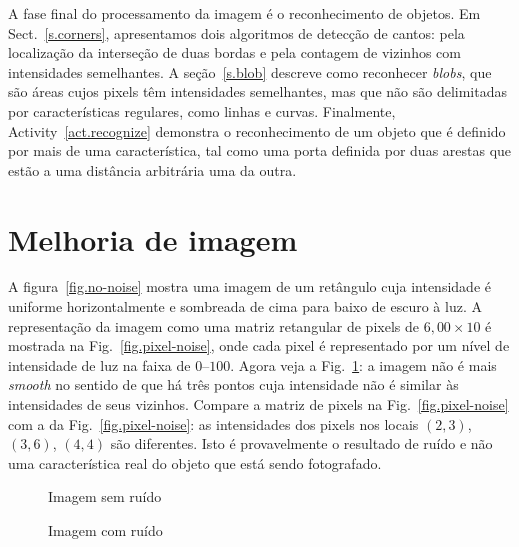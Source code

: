 A fase final do processamento da imagem é o reconhecimento de objetos. Em Sect.~\ref{s.corners}, apresentamos dois algoritmos de detecção de cantos: pela localização da interseção de duas bordas e pela contagem de vizinhos com intensidades semelhantes. A seção~\ref{s.blob} descreve como reconhecer \emph{blobs}, que são áreas cujos pixels têm intensidades semelhantes, mas que não são delimitadas por características regulares, como linhas e curvas. Finalmente, Activity~\ref{act.recognize} demonstra o reconhecimento de um objeto que é definido por mais de uma característica, tal como uma porta definida por duas arestas que estão a uma distância arbitrária uma da outra.

\section{Melhoria de imagem}\label{s.enhance}

A figura~\ref{fig.no-noise} mostra uma imagem de um retângulo cuja intensidade é uniforme horizontalmente e sombreada de cima para baixo de escuro à luz. A representação da imagem como uma matriz retangular de pixels de $6,00\times 10$ é mostrada na Fig.~\ref{fig.pixel-noise}, onde cada pixel é representado por um nível de intensidade de luz na faixa de $0$--$100$. Agora veja a Fig.~\ref{fig.noise}: a imagem não é mais \emph{smooth} no sentido de que há três pontos cuja intensidade não é similar às intensidades de seus vizinhos. Compare a matriz de pixels na Fig.~\ref{fig.pixel-noise} com a da Fig.~\ref{fig.pixel-noise}: as intensidades dos pixels nos locais $(2,3)$, $(3,6)$, $(4,4)$ são diferentes. Isto é provavelmente o resultado de ruído e não uma característica real do objeto que está sendo fotografado. 

\begin{figure}
\begin{minipage}{.45\textwidth}
\caption{Imagem sem ruído}\label{fig.no-noise}
\end{minipage}
\hspace{\fill}
\begin{minipage}{.45\textwidth}
\caption{Imagem com ruído}\label{fig.noise}
\end{minipage}
\end{figure}

